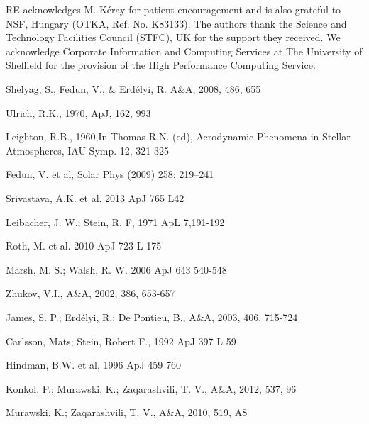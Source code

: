 \documentclass{aa}
\begin{document}
\begin{acknowledgements}
RE acknowledges M. K\'eray for patient encouragement and is also grateful to NSF, Hungary (OTKA, Ref. No. K83133). 
The authors thank the Science and Technology Facilities Council (STFC), UK for the support they received. We acknowledge Corporate Information and Computing Services at The University of Sheffield for the provision of the High Performance Computing Service.
\end{acknowledgements}



\begin{thebibliography}{}




 Shelyag, S., Fedun, V., \& Erd\'elyi, R. A\&A, 2008, 486, 655

 Ulrich, R.K., 1970, ApJ, 162, 993

 Leighton, R.B., 1960,In Thomas R.N. (ed), Aerodynamic Phenomena in Stellar Atmospheres, IAU Symp. 12, 321-325

 Fedun, V. et al,  Solar Phys (2009) 258: 219–241

 Srivastava, A.K. et al. 2013 ApJ 765 L42

 Leibacher, J. W.; Stein, R. F, 1971 ApL 7,191-192

 Roth, M. et al. 2010 ApJ 723 L 175

  Marsh, M. S.; Walsh, R. W. 2006 ApJ 643 540-548

 Zhukov, V.I., A\&A, 2002, 386, 653-657

 James, S. P.; Erdélyi, R.; De Pontieu, B., A\&A, 2003, 406, 715-724

 Carlsson, Mats; Stein, Robert F., 1992 ApJ 397 L 59

 Hindman, B.W. et al, 1996 ApJ 459 760

 Konkol, P.; Murawski, K.; Zaqarashvili, T. V., A\&A, 2012, 537, 96

  Murawski, K.; Zaqarashvili, T. V., A\&A, 2010, 519, A8


\end{thebibliography}
\end{document}
